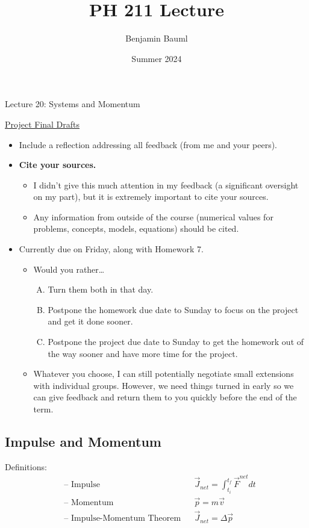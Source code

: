 \documentclass[]{article}
\title{PH 211 Lecture \Week}
\author{Benjamin Bauml}
\date{Summer 2024}
\newcommand{\Week}{20}
\begin{document}
\begin{TeacherMargin}

\end{TeacherMargin}
\begin{PresentSpace}
\begin{center}
	\huge Lecture \Week: Systems and Momentum
\end{center}
\vspace{0.5cm}
\underline{Project Final Drafts}
\begin{itemize}
	\item Include a reflection addressing all feedback (from me and your peers).
	\item \textbf{Cite your sources.}
	\begin{itemize}
		\item I didn't give this much attention in my feedback (a significant oversight on my part), but it is extremely important to cite your sources.
		\item Any information from outside of the course (numerical values for problems, concepts, models, equations) should be cited.
	\end{itemize}
	\item Currently due on Friday, along with Homework 7.
	\begin{itemize}
		\item Would you rather\dots
		\begin{enumerate}[(A)]
			\item Turn them both in that day.
			\item Postpone the homework due date to Sunday to focus on the project and get it done sooner.
			\item Postpone the project due date to Sunday to get the homework out of the way sooner and have more time for the project.
		\end{enumerate}
		\item Whatever you choose, I can still potentially negotiate small extensions with individual groups. However, we need things turned in early so we can give feedback and return them to you quickly before the end of the term.
	\end{itemize}
\end{itemize}
\end{PresentSpace}
\newpage
\begin{TeacherMargin}

\end{TeacherMargin}
\begin{PresentSpace}
\vspace{-10pt}
\section*{Impulse and Momentum}
\vspace{-5pt}
Definitions:
\begin{align*}
	& \text{-- Impulse} & & \vec{J}_{net} = \int_{t_{i}}^{t_{f}}\vec{F}^{net}dt \\
	& \text{-- Momentum} & & \vec{p} = m\vec{v} \\
	& \text{-- Impulse-Momentum Theorem} & & \vec{J}_{net} = \Delta\vec{p}
\end{align*}
\end{PresentSpace}
\end{document}
